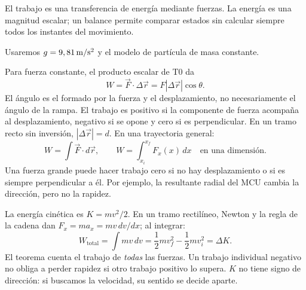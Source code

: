 \documentclass[11pt,a4paper]{article}
\begin{document}
\shorthandoff{<>}
\color{Ink}
El trabajo es una transferencia de energ\'ia mediante fuerzas.
La energ\'ia es una magnitud escalar; un balance permite comparar estados sin
calcular siempre todos los instantes del movimiento.
\begin{lessonindex}
\end{lessonindex}
Usaremos $g=9,81\,\mathrm{m/s^2}$ y el modelo de part\'icula de masa constante.
\precisionnote

Para fuerza constante, el producto escalar de T0 da
\[
W=\vec F\cdot\Delta\vec r=F|\Delta\vec r|\cos\theta.
\]
El \'angulo es el formado por la fuerza y el desplazamiento, no necesariamente
el \'angulo de la rampa. El trabajo es positivo si la componente de fuerza
acompa\~na al desplazamiento, negativo si se opone y cero si es perpendicular.
En un tramo recto sin inversi\'on, $|\Delta\vec r|=d$.
En una trayectoria general:
\[
W=\int\vec F\cdot d\vec r,\qquad
W=\int_{x_i}^{x_f}F_x(x)\,dx\quad\text{en una dimensi\'on}.
\]
Una fuerza grande puede hacer trabajo cero si no hay desplazamiento o si es
siempre perpendicular a \'el. Por ejemplo, la resultante radial del MCU cambia
la direcci\'on, pero no la rapidez.

La energ\'ia cin\'etica es $K=mv^2/2$. En un tramo rectil\'ineo,
Newton y la regla de la cadena dan
$F_x=ma_x=mv\,dv/dx$; al integrar:
\[
W_{\mathrm{total}}=\int mv\,dv
=\frac12mv_f^2-\frac12mv_i^2=\Delta K.
\]
El teorema cuenta el trabajo de \emph{todas} las fuerzas.
Un trabajo individual negativo no obliga a perder rapidez si otro trabajo positivo
lo supera. $K$ no tiene signo de direcci\'on: si buscamos la velocidad, su sentido
se decide aparte.
\end{document}

